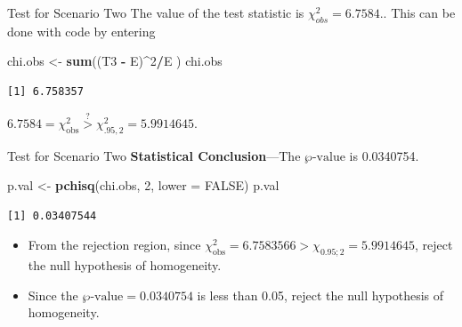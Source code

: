 \documentclass[
  ignorenonframetext,
]{beamer}
\newenvironment{Shaded}{\begin{snugshade}}{\end{snugshade}}
\newcommand{\AttributeTok}[1]{\textcolor[rgb]{0.13,0.29,0.53}{#1}}
\newcommand{\ConstantTok}[1]{\textcolor[rgb]{0.56,0.35,0.01}{#1}}
\newcommand{\DecValTok}[1]{\textcolor[rgb]{0.00,0.00,0.81}{#1}}
\newcommand{\FunctionTok}[1]{\textcolor[rgb]{0.13,0.29,0.53}{\textbf{#1}}}
\newcommand{\NormalTok}[1]{#1}
\newcommand{\OtherTok}[1]{\textcolor[rgb]{0.56,0.35,0.01}{#1}}
\newcommand{\SpecialCharTok}[1]{\textcolor[rgb]{0.81,0.36,0.00}{\textbf{#1}}}
\begin{document}
\begin{frame}[fragile]{Test for Scenario Two}
\label{test-for-scenario-two-3}
The value of the test statistic is \(\chi^2_{obs}=6.7584.\). This can be
done with code by entering

\begin{Shaded}
\begin{Highlighting}[]
\NormalTok{chi.obs }\OtherTok{\textless{}{-}} \FunctionTok{sum}\NormalTok{((T3 }\SpecialCharTok{{-}}\NormalTok{ E)}\SpecialCharTok{\^{}}\DecValTok{2}\SpecialCharTok{/}\NormalTok{E )}
\NormalTok{chi.obs}
\end{Highlighting}
\end{Shaded}

\begin{verbatim}
[1] 6.758357
\end{verbatim}

\(6.7584 = \chi^2_{\text{obs}}\overset{?}{>} \chi^2_{.95,2}= 5.9914645.\)
\end{frame}

\begin{frame}[fragile]{Test for Scenario Two}
\label{test-for-scenario-two-4}
\textbf{Statistical Conclusion}---The \(\wp\text{-value}\) is 0.0340754.

\begin{Shaded}
\begin{Highlighting}[]
\NormalTok{p.val }\OtherTok{\textless{}{-}} \FunctionTok{pchisq}\NormalTok{(chi.obs, }\DecValTok{2}\NormalTok{, }\AttributeTok{lower =} \ConstantTok{FALSE}\NormalTok{)}
\NormalTok{p.val}
\end{Highlighting}
\end{Shaded}

\begin{verbatim}
[1] 0.03407544
\end{verbatim}

\begin{itemize}
\item
  From the rejection region, since
  \(\chi_{\text{obs}}^2=6.7583566 > \chi_{0.95;2} = 5.9914645\), reject
  the null hypothesis of homogeneity.
\item
  Since the \(\wp\text{-value}= 0.0340754\) is less than 0.05, reject
  the null hypothesis of homogeneity.
\end{itemize}
\end{frame}
\end{document}
